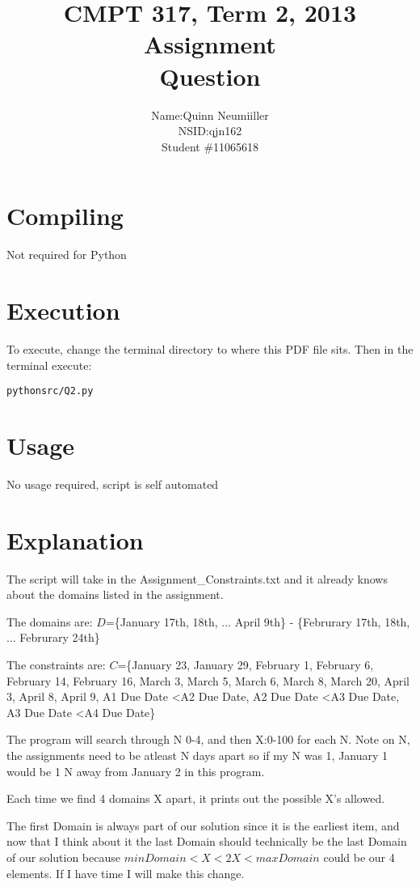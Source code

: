 \documentclass{article}
\title{CMPT 317, Term 2, 2013\\
Assignment \AssignmentNum\\
Question \QuestionNum\\
\AssignmentTitle
}
\author{
	\begin{tabular}{ l r }
	  Name: & Quinn Neumiiller \\
	  NSID: & qjn162 \\
	  Student \# & 11065618 \\
	\end{tabular}
}
\date{\AssignmentDate}
\newcommand{\QuestionNum}{2}
\begin{document}
   \maketitle
   
   \section{Compiling}
   Not required for Python

   \section{Execution}
   To execute, change the terminal directory to where this PDF file sits.
   Then in the terminal execute:
	\begin{alltt}
	python src/Q\QuestionNum.py
	\end{alltt}

  \section{Usage}
    No usage required, script is self automated
  \section{Explanation}
    The script will take in the Assignment\_Constraints.txt and it already knows about the domains listed in the assignment.

    The domains are:
    $D$=\{January 17th, 18th, ... April 9th\} - \{Februrary 17th, 18th, ... Februrary 24th\}

    The constraints are:
    $C$=\{January 23, January 29, February 1, February 6, February 14, February 16, March 3, March 5, March 6, March 8, March 20, April 3, April 8, April 9, A1 Due Date \textless A2 Due Date, A2 Due Date \textless A3 Due Date, A3 Due Date \textless A4 Due Date\}

    The program will search through N 0-4, and then X:0-100 for each N. Note on N, the assignments need to be atleast N days apart so if my N was 1, January 1 would be 1 N away from January 2 in this program.

    Each time we find 4 domains X apart, it prints out the possible X's allowed. 

    The first Domain is always part of our solution since it is the earliest item, and now that I think about it the last Domain should technically
    be the last Domain of our solution because $minDomain < X < 2X < maxDomain$ could be our 4 elements. If I have time I will make this change.
\end{document}
